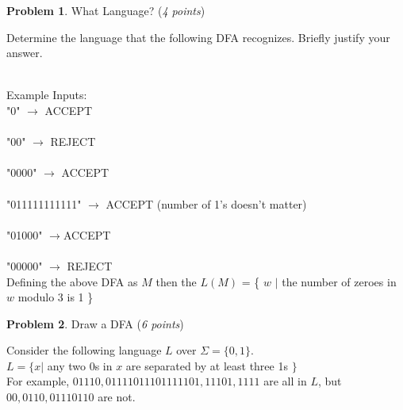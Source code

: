 \documentclass[11pt]{article}
\theoremstyle{definition}
\theoremstyle{theorem}
\newtheorem{prob}{Problem}
\newcommand{\solution}{\medskip\noindent{\color{blue}\textbf{Solution:}}}
\begin{document}
\newpage

\begin{prob} What Language? (\emph{4 points})\end{prob}

Determine the language that the following DFA recognizes. Briefly justify your answer.


\solution
\\Example Inputs:\\
"0" $\rightarrow$ ACCEPT \\\\
"00" $\rightarrow$ REJECT \\\\
"0000" $\rightarrow$ ACCEPT \\\\
"011111111111" $\rightarrow$ ACCEPT (number of 1's doesn't matter) \\\\
"01000" $\rightarrow$ACCEPT \\\\
"00000" $\rightarrow$ REJECT \\

\noindent Defining the above DFA as $M$ then the $L(M)$ = \{ $w$ $|$ the number of zeroes in $w$ modulo 3 is 1 \} 


\newpage

\begin{prob} Draw a DFA (\emph{6 points})\end{prob}


Consider the following language $L$ over $\Sigma = \{0, 1\}$. \\

$L = \{x | $ any two 0s in $x$ are separated by at least three 1s $\}$\\

For example, $01110, 01111011101111101, 11101, 1111$ are all in $L$, but $00, 0110, 01110110$ are not.\\
\end{document}
